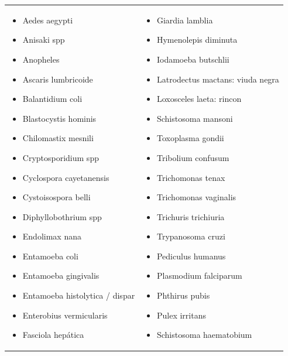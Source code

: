 \documentclass[letter,12pt]{report}
\begin{document}
\begin{tabular}{p{}p{}}
    \begin{itemize}
        \item Aedes aegypti
        \item Anisaki spp
        \item Anopheles
        \item Ascaris lumbricoide
        \item Balantidium coli
        \item Blastocystis hominis
        \item Chilomastix mesnili
        \item Cryptosporidium spp
        \item Cyclospora cayetanensis
        \item Cystoisospora belli
        \item Diphyllobothrium spp
        \item Endolimax nana
        \item Entamoeba coli
        \item Entamoeba gingivalis
        \item Entamoeba histolytica / dispar
        \item Enterobius vermicularis
        \item Fasciola hepática
    \end{itemize} &
    \begin{itemize}
        \item Giardia lamblia
        \item Hymenolepis diminuta
        \item Iodamoeba butschlii
        \item Latrodectus mactans: viuda negra
        \item Loxosceles laeta: rincon
        \item Schistosoma mansoni
        \item Toxoplasma gondii
        \item Tribolium confusum
        \item Trichomonas tenax
        \item Trichomonas vaginalis
        \item Trichuris trichiuria
        \item Trypanosoma cruzi
        \item Pediculus humanus
        \item Plasmodium falciparum
        \item Phthirus pubis
        \item Pulex irritans
        \item Schistosoma haematobium
    \end{itemize}\\
\end{tabular}
\end{document}
